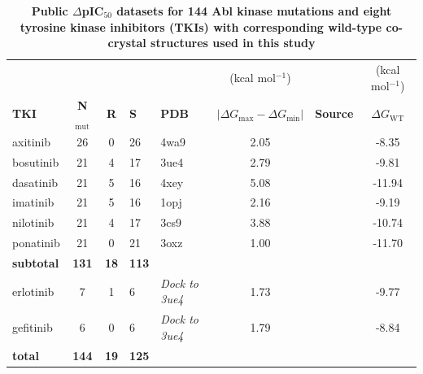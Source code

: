 \documentclass[phd,tocprelim]{cornell}
\begin{document}
\begin{landscape}
\begin{table}[bt]
	\centering
	\caption[ Public $\Delta$pIC$_{50}$ datasets for 144 Abl kinase mutations and eight tyrosine kinase inhibitors (TKIs) with corresponding wild-type co-crystal structures used in this study]{
		\label{tab:abl-table-1}
		{\bf Public $\Delta$pIC$_{50}$ datasets for 144 Abl kinase mutations and eight tyrosine kinase inhibitors (TKIs) with corresponding wild-type co-crystal structures used in this study}
	}
	\setlength{\tabcolsep}{4pt}
	\begin{tabularx}{\textwidth}{X c c X X S S S}
		\toprule
		&				 		&			& 			&				& {(kcal mol$^{-1}$)}  										&										& {(kcal mol$^{-1}$)}		\\
		{\bf TKI}	& {\bf N}$_\mathrm{mut}$& {\bf R}	& {\bf S}	& {\bf PDB}		& {$|\Delta G_\mathrm{max} - \Delta G_\mathrm{min}|$}	& {\bf Source}							& {$\Delta G_\mathrm{WT}$} \\
		\toprule
		axitinib	& 26					& 0			& 26		& 4wa9          & 2.05    												& \cite{Pemovska:Nature:2015}			& -8.35		\\
		bosutinib	& 21					& 4			& 17		& 3ue4         	& 2.79    												& \cite{Gozgit3992}						& -9.81		\\
		dasatinib	& 21					& 5			& 16		& 4xey        	& 5.08    												& \cite{Gozgit3992}						& -11.94	\\
		imatinib	& 21					& 5			& 16		& 1opj          & 2.16    												& \cite{Gozgit3992} 					& -9.19		\\
		nilotinib	& 21					& 4			& 17		& 3cs9       	& 3.88    												& \cite{Gozgit3992} 					& -10.74	\\
		ponatinib	& 21					& 0			& 21		& 3oxz        	& 1.00    												& \cite{Gozgit3992} 					& -11.70	\\
		{\bf subtotal}& {\bf 131}			&{\bf 18}	&{\bf 113}	& 				& 	    												& 										&	\\
		erlotinib	& 7 					& 1			& 6			& \it{Dock to 3ue4}	& 1.73    												& \cite{Davis:Nat.Biotechnol.:2011}		& -9.77		\\
		gefitinib	& 6						& 0			& 6			& \it{Dock to 3ue4}	& 1.79    												& \cite{Davis:Nat.Biotechnol.:2011}		& -8.84		\\
		{\bf total}	& {\bf 144}				&{\bf 19}	&{\bf 125}	& 				&														&										& 	\\
		\bottomrule
	\end{tabularx}

\end{table}
\end{landscape}
\end{document}
